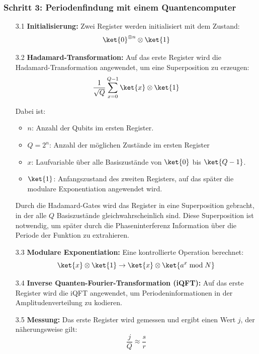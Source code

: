 \subsubsection*{Schritt 3: Periodenfindung mit einem Quantencomputer}

\begin{enumerate}
  \item[3.1] \textbf{Initialisierung:}  
  Zwei Register werden initialisiert mit dem Zustand:
  \[
  \ket{0}^{\otimes n} \otimes \ket{1}
  \]

  \item[3.2] \textbf{Hadamard-Transformation:}  
  Auf das erste Register wird die Hadamard-Transformation angewendet, um eine Superposition zu erzeugen:
  \[
  \frac{1}{\sqrt{Q}} \sum_{x=0}^{Q-1} \ket{x} \otimes \ket{1}
  \]
  
  Dabei ist:
  \begin{itemize}
    \item \( n \): Anzahl der Qubits im ersten Register.
    \item \( Q = 2^n \): Anzahl der möglichen Zustände im ersten Register
    \item \( x \): Laufvariable über alle Basiszustände von \( \ket{0} \) bis \( \ket{Q-1} \).
    \item \( \ket{1} \): Anfangszustand des zweiten Registers, auf das später die modulare Exponentiation angewendet wird.
  \end{itemize}

  Durch die Hadamard-Gates wird das Register in eine Superposition gebracht, in der alle \( Q \) Basiszustände gleichwahrscheinlich sind. Diese Superposition ist notwendig, um später durch die Phaseninterferenz Information über die Periode der Funktion zu extrahieren.\\

  \item[3.3] \textbf{Modulare Exponentiation:}  
  Eine kontrollierte Operation berechnet:
  \[
  \ket{x} \otimes \ket{1} \rightarrow \ket{x} \otimes \ket{a^x \bmod N}
  \]

  \item[3.4] \textbf{Inverse Quanten-Fourier-Transformation (iQFT):}  
  Auf das erste Register wird die iQFT angewendet, um Periodeninformationen in der Amplitudenverteilung zu kodieren.\\

  \item[3.5] \textbf{Messung:}  
  Das erste Register wird gemessen und ergibt einen Wert \( j \), der näherungsweise gilt:
  \[
  \frac{j}{Q} \approx \frac{s}{r}
  \]


\end{enumerate}
